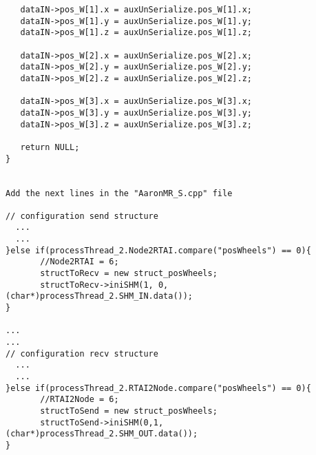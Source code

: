 \begin{verbatim}
   dataIN->pos_W[1].x = auxUnSerialize.pos_W[1].x;
   dataIN->pos_W[1].y = auxUnSerialize.pos_W[1].y;
   dataIN->pos_W[1].z = auxUnSerialize.pos_W[1].z;

   dataIN->pos_W[2].x = auxUnSerialize.pos_W[2].x;
   dataIN->pos_W[2].y = auxUnSerialize.pos_W[2].y;
   dataIN->pos_W[2].z = auxUnSerialize.pos_W[2].z;

   dataIN->pos_W[3].x = auxUnSerialize.pos_W[3].x;
   dataIN->pos_W[3].y = auxUnSerialize.pos_W[3].y;
   dataIN->pos_W[3].z = auxUnSerialize.pos_W[3].z;

   return NULL;
}


Add the next lines in the "AaronMR_S.cpp" file

// configuration send structure
  ...
  ...
}else if(processThread_2.Node2RTAI.compare("posWheels") == 0){
       //Node2RTAI = 6;
       structToRecv = new struct_posWheels;
       structToRecv->iniSHM(1, 0, (char*)processThread_2.SHM_IN.data());
}

...
...
// configuration recv structure
  ...
  ...
}else if(processThread_2.RTAI2Node.compare("posWheels") == 0){
       //RTAI2Node = 6;
       structToSend = new struct_posWheels;
       structToSend->iniSHM(0,1, (char*)processThread_2.SHM_OUT.data());
}

\end{verbatim}


